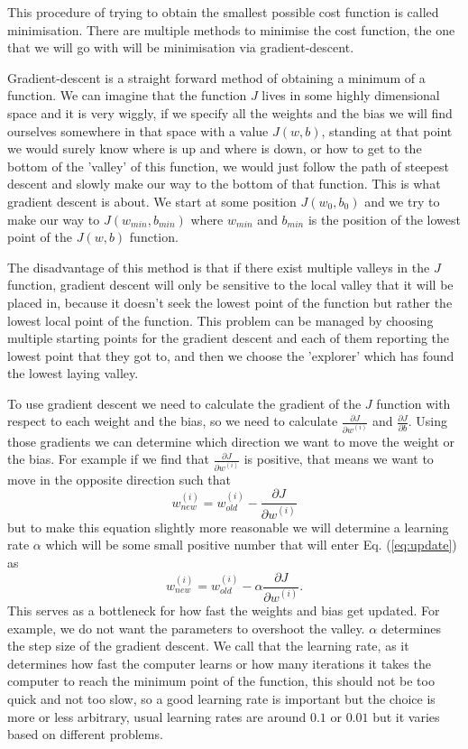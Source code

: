 This procedure of trying to obtain the smallest possible cost function
is called minimisation. There are multiple methods to minimise the 
cost function, the one that we will go with will be minimisation via
gradient-descent.

Gradient-descent is a straight forward method of obtaining a minimum
of a function. We can imagine that the function $J$ lives in some
highly dimensional space and it is very wiggly, if we specify all
the weights and the bias we will find ourselves somewhere in that space
with a value $J(w,b)$, standing at that point we would surely know
where is up and where is down, or how to get to the bottom of
the 'valley' of this function, we would just follow the path of 
steepest descent and slowly make our way to the bottom of that function.
This is what gradient descent is about. We start at some position
$J(w_0,b_0)$ and we try to make our way to $J(w_{min}, b_{min})$
where $w_{min}$ and $b_{min}$ is the position of the lowest point
of the $J(w,b)$ function.

The disadvantage of this method is that if there exist multiple valleys 
in the $J$ function, gradient descent will only be sensitive to the 
local valley that it will be placed in, because it doesn't seek
the lowest point of the function but rather the lowest
local point of the function. This problem can be managed by choosing 
multiple starting points for the gradient descent and each of them
reporting the lowest point that they got to, and then we choose
the 'explorer' which has found the lowest laying valley.

To use gradient descent we need to calculate the gradient of the 
$J$ function with respect to each weight and the bias, so
we need to calculate $\frac{\partial J}{\partial w^{(i)}}$ and
$\frac{\partial J }{\partial b}$. Using those gradients we can
determine which direction we want to move the weight or the bias.
For example if we find that $\frac{\partial J}{ \partial w^{(i)}}$ is 
positive, that means we want to move in the opposite direction
such that
\begin{equation}\label{eq:update}
    w^{(i)}_{new} = 
    w^{(i)}_{old} - \frac{\partial J}{\partial w^{(i)}}
\end{equation}
but to make this equation slightly more reasonable we will determine
a learning rate $\alpha$ which will be some small positive number
that will enter Eq. (\ref{eq:update}) as
\begin{equation}
    w^{(i)}_{new} = 
    w^{(i)}_{old} - \alpha \frac{\partial J}{\partial w^{(i)}}.
\end{equation}
This serves as a bottleneck for how fast the weights and bias get updated.
For example, we do not want the parameters to overshoot the valley.
$\alpha$ determines the step size of the gradient descent. We call that
the learning rate, as it determines how fast the computer learns or 
how many iterations it takes the computer to reach the minimum point
of the function, this should not be too quick and not too slow, so
a good learning rate is important but the choice is more or less
arbitrary, usual learning rates are around $0.1$ or $0.01$ but
it varies based on different problems.

